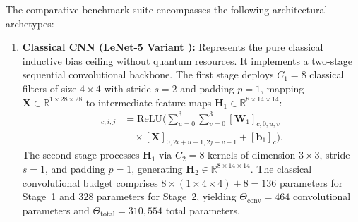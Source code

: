 \documentclass[journal]{IEEEtran}
\begin{document}
The comparative benchmark suite encompasses the following architectural archetypes:
\begin{enumerate}
    \item \textbf{Classical CNN (LeNet-5 Variant \cite{lecun1998gradient}):} Represents the pure classical inductive bias ceiling without quantum resources. It implements a two-stage sequential convolutional backbone. The first stage deploys $C_1 = 8$ classical filters of size $4 \times 4$ with stride $s=2$ and padding $p=1$, mapping $\mathbf{X} \in \mathbb{R}^{1 \times 28 \times 28}$ to intermediate feature maps $\mathbf{H}_1 \in \mathbb{R}^{8 \times 14 \times 14}$:
    \begin{align}
    [\mathbf{H}_1]_{c, i, j} &= \mathrm{ReLU}\Big( \sum_{u=0}^3 \sum_{v=0}^3 [\mathbf{W}_1]_{c, 0, u, v} \nonumber \\
    &\quad \times [\mathbf{X}]_{0, 2i+u-1, 2j+v-1} + [\mathbf{b}_1]_c \Big).
    \label{eq:lenet_stage1}
    \end{align}
    The second stage processes $\mathbf{H}_1$ via $C_2 = 8$ kernels of dimension $3 \times 3$, stride $s=1$, and padding $p=1$, generating $\mathbf{H}_2 \in \mathbb{R}^{8 \times 14 \times 14}$. The classical convolutional budget comprises $8 \times (1 \times 4 \times 4) + 8 = 136$ parameters for Stage~1 and $328$ parameters for Stage~2, yielding $\Theta_{\mathrm{conv}} = 464$ convolutional parameters and $\Theta_{\mathrm{total}} = 310{,}554$ total parameters.


\end{enumerate}
\end{document}
